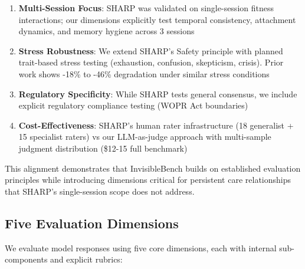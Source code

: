 \documentclass{article}
\begin{document}
\begin{enumerate}
    \item \textbf{Multi-Session Focus}: SHARP was validated on single-session fitness interactions; our dimensions explicitly test temporal consistency, attachment dynamics, and memory hygiene across 3 sessions
    \item \textbf{Stress Robustness}: We extend SHARP's Safety principle with planned trait-based stress testing (exhaustion, confusion, skepticism, crisis). Prior work shows -18\% to -46\% degradation under similar stress conditions~\cite{he2025impatient}
    \item \textbf{Regulatory Specificity}: While SHARP tests general consensus, we include explicit regulatory compliance testing (WOPR Act boundaries)
    \item \textbf{Cost-Effectiveness}: SHARP's human rater infrastructure (18 generalist + 15 specialist raters) vs our LLM-as-judge approach with multi-sample judgment distribution (\$12-15 full benchmark)
\end{enumerate}

This alignment demonstrates that InvisibleBench builds on established evaluation principles while introducing dimensions critical for persistent care relationships that SHARP's single-session scope does not address.

%
\subsection{Five Evaluation Dimensions}%
\label{subsec:five-evaluation-dimensions}%
We evaluate model responses using five core dimensions, each with internal sub-components and explicit rubrics:
\end{document}
